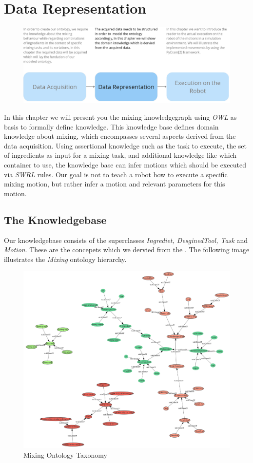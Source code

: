\chapter{Data Representation}
\label{chap:Data_representation}
\begin{figure}[H]
    \includegraphics[scale=0.25]{Graphics/structure_overview2.jpg}
\end{figure} 
In this chapter we will present you the mixing knowledgegraph using \textit{OWL} as basis to formally define knowledge.
This knowledge base defines domain knowledge about mixing, which encompasses several aspects derived from the data acquisition.
Using assertional knowledge such as the task to execute, the set of ingredients as input for a mixing task, 
and additional knowledge like which container to use, the knowledge base can infer motions which should be executed via \textit{SWRL} rules.
Our goal is not to teach a robot how to execute a specific mixing motion, but rather infer a motion and relevant parameters for this motion. 
\section{The Knowledgebase}
Our knowledgebase consists of the superclasses \textit{Ingrediet, DesginedTool, Task} and \textit{Motion}. These are the concepets which we dervied from the . The following image illustrates the \textit{Mixing} ontology hierarchy.
\begin{figure}[H]
    \includegraphics[scale=0.5]{Graphics/classHierarchy/taxonomy.png}
    \centering
    \caption{Mixing Ontology Taxonomy}
\end{figure}

